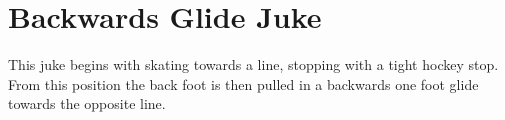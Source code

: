 \section{Backwards Glide Juke}

This juke begins with skating towards a line, stopping with a tight hockey stop. 
From this position the back foot is then pulled in a backwards one foot glide towards the opposite line. 
